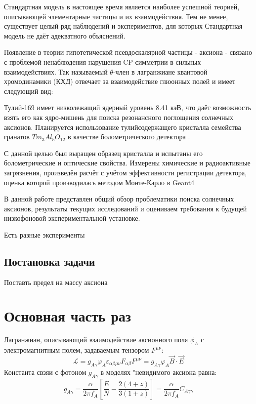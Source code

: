 \documentclass[a4paper,article,14pt]{extarticle}
\begin{document}

\tableofcontents
\pagebreak


Стандартная модель в настоящее время является наиболее успешной теорией, описывающей элементарные частицы и их взаимодействия. Тем не менее, существует целый ряд наблюдений и экспериментов, для которых Стандартная модель не даёт адекватного объяснений.

Появление в теории гипотетической псевдоскалярной частицы - аксиона - связано с проблемой ненаблюдения нарушения CP-симметрии в сильных взаимодействиях. Так называемый $\theta$-член в лагранжиане квантовой хромодинамики (КХД) отвечает за взаимодействие глюонных полей и имеет следующий вид:



Тулий-169 имеет низколежащий ядерный уровень 8.41 кэВ, что даёт возможность взять его как ядро-мишень для поиска резонансного поглощения солнечных аксионов. Планируется использование тулийсодержащего кристалла семейства гранатов $Tm_3Al_5O_{12}$ в качестве болометрического детектора . 

С данной целью был выращен образец кристалла и испытаны его болометрические и оптические свойства. Измерены химические и радиоактивные загрязнения, произведён расчёт с учётом эффективности регистрации детектора, оценка которой производилась методом Монте-Карло в Geant4

В данной работе представлен общий обзор проблематики поиска солнечных аксионов, результаты текущих исследований и оцениваем требования к будущей низкофоновой экспериментальной установке.






Есть разные эксперименты

\subsection{Постановка задачи}

Поставть предел на массу аксиона

\section{Основная часть раз}
Лагранжиан, описывающий взаимодействие аксионного поля $\phi_A$ с электромагнитным полем, задаваемым тензором $F^{\mu \nu}$:
\begin{equation}
    \mathcal{L}  = {g_{A\gamma }}{\varphi _A}{\varepsilon _{\alpha \beta \mu \nu }}{F_{\alpha \beta }}{F^{\mu \nu }} = {g_{A\gamma }}{\varphi _A}\vec B \cdot \vec E
\end{equation}
Константа свзяи с фотоном $g_{A\gamma}$ в моделях "невидимого аксиона равна:
\begin{equation}
   {g_{A\gamma }} = \frac{\alpha }{{2\pi {f_A}}}\left[ {\frac{E}{N} - \frac{{2\left( {4 + z} \right)}}{{3\left( {1 + z} \right)}}} \right] = \frac{\alpha }{{2\pi {f_A}}}{C_{A\gamma \gamma }}
\end{equation}
\end{document}
